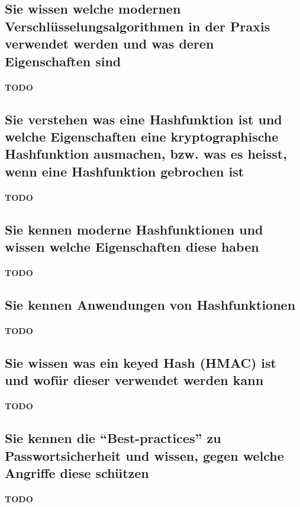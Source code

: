 \documentclass[10pt,a4paper]{article}
\begin{document}
\subsection*{Sie wissen welche modernen Verschlüsselungsalgorithmen in der Praxis verwendet werden und was deren Eigenschaften sind}
\paragraph*{TODO}
\subsection*{Sie verstehen was eine Hashfunktion ist und welche Eigenschaften eine kryptographische Hashfunktion ausmachen, bzw. was es heisst, wenn eine Hashfunktion gebrochen ist}
\paragraph*{TODO}
\subsection*{Sie kennen moderne Hashfunktionen und wissen welche Eigenschaften diese haben}
\paragraph*{TODO}
\subsection*{Sie kennen Anwendungen von Hashfunktionen}
\paragraph*{TODO}
\subsection*{Sie wissen was ein keyed Hash (HMAC) ist und wofür dieser verwendet werden kann}
\paragraph*{TODO}
\subsection*{Sie kennen die "`Best-practices"' zu Passwortsicherheit und wissen, gegen welche Angriffe diese schützen}
\paragraph*{TODO}
\end{document}
